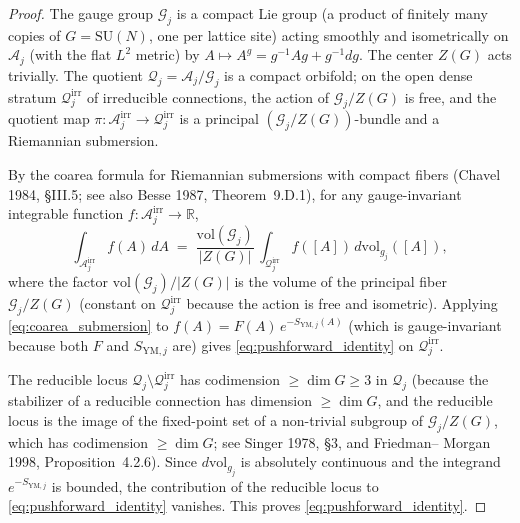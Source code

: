 \begin{proof}
The gauge group $\mathcal{G}_{j}$ is a compact Lie group (a
product of finitely many copies of $G=\mathrm{SU}(N)$, one per
lattice site) acting smoothly and isometrically on
$\mathcal{A}_{j}$ (with the flat $L^{2}$ metric) by
$A\mapsto A^{g}=g^{-1}Ag+g^{-1}dg$. The center $Z(G)$ acts
trivially. The quotient $\mathcal{Q}_{j}=\mathcal{A}_{j}/
\mathcal{G}_{j}$ is a compact orbifold; on the open dense stratum
$\mathcal{Q}_{j}^{\mathrm{irr}}$ of irreducible connections, the
action of $\mathcal{G}_{j}/Z(G)$ is free, and the quotient map
$\pi:\mathcal{A}_{j}^{\mathrm{irr}}\to\mathcal{Q}_{j}^{\mathrm{irr}}$
is a principal $(\mathcal{G}_{j}/Z(G))$-bundle and a Riemannian
submersion.

By the coarea formula for Riemannian submersions with compact
fibers (Chavel 1984, \S III.5; see also Besse 1987,
Theorem~9.D.1), for any gauge-invariant integrable function
$f:\mathcal{A}_{j}^{\mathrm{irr}}\to\mathbb{R}$,
\begin{equation}
\label{eq:coarea_submersion}
  \int_{\mathcal{A}_{j}^{\mathrm{irr}}}f(A)\,dA
  \;=\;\frac{\mathrm{vol}(\mathcal{G}_{j})}{|Z(G)|}\,
  \int_{\mathcal{Q}_{j}^{\mathrm{irr}}}f([A])\,
  d\mathrm{vol}_{g_{j}}([A]),
\end{equation}
where the factor $\mathrm{vol}(\mathcal{G}_{j})/|Z(G)|$ is the
volume of the principal fiber $\mathcal{G}_{j}/Z(G)$ (constant on
$\mathcal{Q}_{j}^{\mathrm{irr}}$ because the action is free and
isometric). Applying \eqref{eq:coarea_submersion} to
$f(A)=F(A)\,e^{-S_{\mathrm{YM},j}(A)}$ (which is gauge-invariant
because both $F$ and $S_{\mathrm{YM},j}$ are) gives
\eqref{eq:pushforward_identity} on
$\mathcal{Q}_{j}^{\mathrm{irr}}$.

The reducible locus
$\mathcal{Q}_{j}\setminus\mathcal{Q}_{j}^{\mathrm{irr}}$ has
codimension $\ge\dim G\ge 3$ in $\mathcal{Q}_{j}$ (because the
stabilizer of a reducible connection has dimension $\ge\dim G$,
and the reducible locus is the image of the fixed-point set of a
non-trivial subgroup of $\mathcal{G}_{j}/Z(G)$, which has
codimension $\ge\dim G$; see Singer 1978, \S 3, and Friedman--
Morgan 1998, Proposition~4.2.6). Since $d\mathrm{vol}_{g_{j}}$
is absolutely continuous and the integrand
$e^{-S_{\mathrm{YM},j}}$ is bounded, the contribution of the
reducible locus to \eqref{eq:pushforward_identity} vanishes.
This proves \eqref{eq:pushforward_identity}.
\end{proof}


